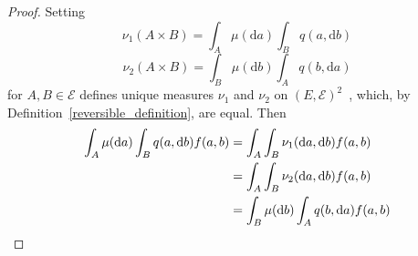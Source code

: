 \documentclass[english,twoside,openright]{HYgraduMLDS}
\newcommand{\dx}{\mathrm{d}}
\begin{document}
\begin{proof}
  Setting
  \[
    \nu_{1}(A\times B) = \int_{A}\mu(\dx a)\int_{B}q(a, \dx b)
  \]
  \[
    \nu_{2}(A\times B) = \int_{B}\mu(\dx b)\int_{A}q(b, \dx a)
  \]
  for \(A, B\in \mathcal{E}\) defines unique measures
  \(\nu_{1}\) and \(\nu_{2}\) on
  \((E, \mathcal{E})^{2}\)~\cite[Theorem 6.11]{Cin11}, which,
  by Definition~\ref{reversible_definition}, are equal. Then
  \begin{align*}
    \int_{A}\mu(\dx a)\int_{B}q(a, \dx b)f(a, b)
    &= \int_{A}\int_{B}\nu_{1}(\dx a, \dx b)f(a, b)
    \\&= \int_{A}\int_{B}\nu_{2}(\dx a, \dx b)f(a, b)
    \\&= \int_{B}\mu(\dx b)\int_{A}q(b, \dx a)f(a, b)
    \qedhere
  \end{align*}
\end{proof}
\end{document}
